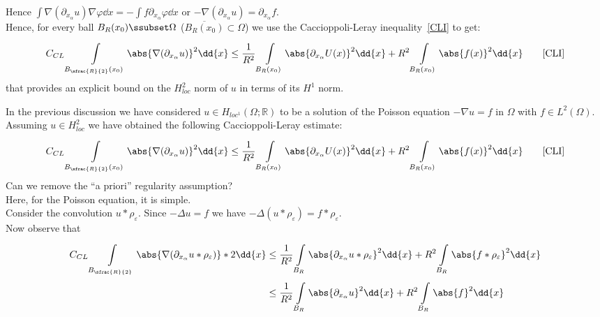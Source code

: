 Hence \( \int \nabla (\partial_{x_{\alpha }}u) \nabla \varphi  \dd{x} = -\int f \partial_{x_{\alpha }}\varphi  \dd{x} \) or \( -\nabla (\partial_{x_{\alpha }}u) = \partial_{x_{\alpha}}f \).\\
Hence, for every ball \( B_{R} (x_{0}) \ssubset \Omega  \) (\( \overline{B_{R} (x_{0})} \subset \Omega  \)) we use the Caccioppoli-Leray inequality~\eqref{CLI}  to get:
\begin{gather}
	C_{CL} \int\limits_{B_{\sfrac{R}{2}}(x_{0})}^{} \abs{\nabla (\partial_{x_{\alpha }}u) }^{2} \dd{x} \leq \frac{1}{R^{2}} \int\limits_{B_{R}(x_{0})}^{} \abs{\partial_{x_{\alpha }}U(x) }^{2} \dd{x} + R^{2} \int\limits_{B_{R}(x_{0})}^{} \abs{f(x) }^{2} \dd{x} \qquad \text{\eqref{CLI}}
\end{gather}
that provides an explicit bound on the \( H_{loc}^{2} \) norm of \( u \) in terms of its \( H^{1} \) norm.\\
\par
In the previous discussion we have considered \( u \in H_{loc^{1}}(\Omega ; \mathbb{R})  \) to be a solution of the Poisson equation \( -\nabla u = f \) in \( \Omega  \) with \( f \in L^{2}(\Omega ) \). Assuming \( u\in H_{loc}^{2} \) we have obtained the following Caccioppoli-Leray estimate:
\begin{gather}
	C_{CL} \int\limits_{B_{\sfrac{R}{2}}(x_{0})}^{} \abs{\nabla (\partial_{x_{\alpha }}u) }^{2} \dd{x} \leq \frac{1}{R^{2}} \int\limits_{B_{R}(x_{0})}^{} \abs{\partial_{x_{\alpha }}U(x) }^{2} \dd{x} + R^{2} \int\limits_{B_{R}(x_{0})}^{} \abs{f(x) }^{2} \dd{x} \qquad \text{\eqref{CLI}}
\end{gather}
Can we remove the \enquote{a priori} regularity assumption?\\
Here, for the Poisson equation, it is simple.\\
Consider the convolution \( u \ast \rho_{\varepsilon } \). Since \( -\Delta  u = f \) we have \( -\Delta  (u \ast \rho_{\varepsilon }) = f\ast \rho _{\varepsilon }\).\\
Now observe that
\begin{align}
	C_{CL} \int\limits_{B_{\sfrac{R}{2}}}^{} \abs{\nabla (\partial_{x_{\alpha }}u\ast \rho _{\varepsilon })}*2 \dd{x} & \leq \frac{1}{R^{2}}\int\limits_{B_{R}}^{} \abs{\partial_{x_{\alpha }}u \ast \rho _{\varepsilon }}^{2} \dd{x} + R^{2}\int\limits_{B_{R}}^{} \abs{f\ast \rho _{\varepsilon }}^{2} \dd{x}  \\
	                                                                                                                  & \leq  \frac{1}{R^{2}} \int\limits_{B_{R}}^{} \abs{\partial_{x_{\alpha }}u}^{2} \dd{x} + R^{2} \int\limits_{B_{R}}^{} \abs{f}^{2} \dd{x}
\end{align}
